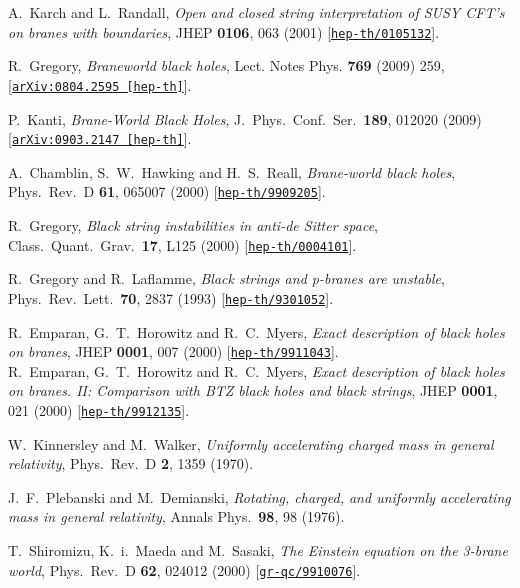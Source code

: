 \documentclass[aps,12pt,prd,superscriptaddress,preprintnumbers, 
	amssymb,
	amsmath,
	notitlepage,
	longbibliography,
	nofootinbib]{revtex4-1}
\begin{document}
\begin{thebibliography}{10}
A.~Karch and L.~Randall,
{\it Open and closed string interpretation of SUSY CFT's on branes with
boundaries},
JHEP {\bf 0106}, 063 (2001)
[\href{http://xxx.lanl.gov/abs/hep-th/0105132}{{\tt hep-th/0105132}}].

R.~Gregory,
{\it Braneworld black holes},
Lect. Notes Phys. {\bf 769} (2009) 259,
[\href{http://xxx.lanl.gov/abs/0804.2595}{{\tt arXiv:0804.2595 [hep-th]}}].

P.~Kanti,
{\it Brane-World Black Holes},
J.\ Phys.\ Conf.\ Ser.\  {\bf 189}, 012020 (2009)
[\href{http://xxx.lanl.gov/abs/0903.2147}{{\tt arXiv:0903.2147 [hep-th]}}].

A.~Chamblin, S.~W.~Hawking and H.~S.~Reall,
{\it Brane-world black holes},
Phys.\ Rev.\ D {\bf 61}, 065007 (2000)
[\href{http://xxx.lanl.gov/abs/hep-th/9909205}{{\tt hep-th/9909205}}].

R.~Gregory,
{\it Black string instabilities in anti-de Sitter space},
Class.\ Quant.\ Grav.\  {\bf 17}, L125 (2000)
[\href{http://xxx.lanl.gov/abs/hep-th/0004101}{{\tt hep-th/0004101}}].

R.~Gregory and R.~Laflamme,
{\it Black strings and p-branes are unstable},
Phys.\ Rev.\ Lett.\  {\bf 70}, 2837 (1993)
[\href{http://xxx.lanl.gov/abs/hep-th/9301052}{{\tt hep-th/9301052}}].

R.~Emparan, G.~T.~Horowitz and R.~C.~Myers,
{\it Exact description of black holes on branes},
JHEP {\bf 0001}, 007 (2000)
[\href{http://xxx.lanl.gov/abs/hep-th/9911043}{{\tt hep-th/9911043}}].\\

R.~Emparan, G.~T.~Horowitz and R.~C.~Myers,
{\it Exact description of black holes on branes. II: 
Comparison with BTZ  black holes and black strings},
JHEP {\bf 0001}, 021 (2000)
[\href{http://xxx.lanl.gov/abs/hep-th/9912135}{{\tt hep-th/9912135}}].

W.~Kinnersley and M.~Walker,
{\it Uniformly accelerating charged mass in general relativity},
Phys.\ Rev.\ D {\bf 2}, 1359 (1970).
  
J.~F.~Plebanski and M.~Demianski,
{\it Rotating, charged, and uniformly accelerating mass in general relativity},
Annals Phys.\  {\bf 98}, 98 (1976).

T.~Shiromizu, K.~i.~Maeda and M.~Sasaki,
{\it The Einstein equation on the 3-brane world},
Phys.\ Rev.\ D {\bf 62}, 024012 (2000)
[\href{http://xxx.lanl.gov/abs/gr-qc/9910076}{{\tt gr-qc/9910076}}].


\end{thebibliography}
\end{document}
